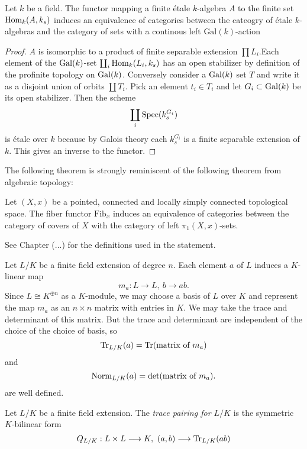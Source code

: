 \begin{theorem}\label{theorem:galois}
	Let $k$ be a field. The functor mapping a finite \'etale $k$-algebra $A$ to the finite set $\operatorname{Hom}_k(A, k_s)$ induces an equivalence of categories between the cateogry of \'etale $k$-algebras and the category of sets with a continous left $\text{Gal}(k)$-action
\end{theorem}

\begin{proof}
	$A$ is isomorphic to a product of finite separable extension $\prod L_i$.Each element of the $\operatorname{Gal}(k)$-set $\coprod_i \operatorname{Hom}_k(L_i, k_s)$ has an open stabilizer by definition of the profinite topology on $\operatorname{Gal}(k)$. Conversely consider a $\operatorname{Gal}(k)$ set $T$ and write it as a disjoint union of orbits $\coprod T_i$. Pick an element $t_i \in T_i$ and let $G_i \subset \operatorname{Gal}(k)$ be its open stabilizer. Then the scheme
	\[
		\coprod_i \operatorname{Spec}(k_s^{G_i})
	\]
	is \'etale over $k$ because by Galois theory each $k_s^{G_i}$ is a finite separable extension of $k$. This gives an inverse to the functor.
\end{proof}

The following theorem is strongly reminiscent of the following theorem from algebraic topology:

\begin{theorem}
	Let $(X,x)$ be a pointed, connected and locally simply connected topological space. The fiber functor $\text{Fib}_x$ induces an equivalence of categories between the category of covers of $X$ with the category of left $\pi_1(X,x)$-sets.
\end{theorem}

See Chapter (...) for the definitions used in the statement.

Let $L/K$ be a finite field extension of degree $n$. Each element $a$ of $L$ induces a $K$-linear map
\[
	m_a: L \to L,\ b \to ab.
\]
Since $L \cong K^{\oplus n}$ as a $K$-module, we may choose a basis of $L$ over $K$ and represent the map $m_a$ as an $n \times n$ matrix with entries in $K$. We may take the trace and determinant of this matrix. But the trace and determinant are independent of the choice of the choice of basis, so
\[
	\operatorname{Tr}_{L/K}(a) = \operatorname{Tr}(\text{matrix of }m_a)
\]
and
\[
	\operatorname{Norm}_{L/K}(a) = \text{det}(\text{matrix of }m_a).
\]
are well defined.

\begin{definition}
	Let $L/K$ be a finite field extension. The \textit{trace pairing for $L/K$} is the symmetric $K$-bilinear form
	\[
		Q_{L/K} : L \times L \longrightarrow K,\ (a,b) \longrightarrow \operatorname{Tr}_{L/K}(ab)
	\]
\end{definition}

